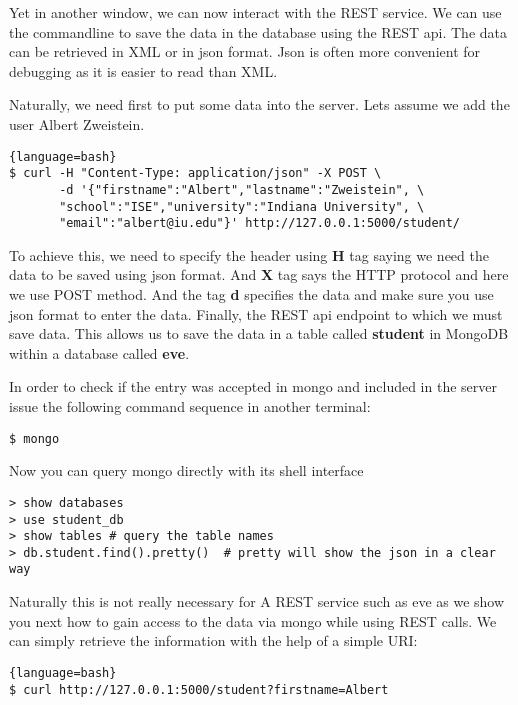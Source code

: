 Yet in another window, we can now interact with the REST service.
We can use the commandline to save the data in the database using the
REST api. The data can be retrieved in XML or in json format. Json is
often more convenient for debugging as it is easier to read than XML.

Naturally, we need first to put some data into the server. Lets assume
we add the user Albert Zweistein.

\begin{lstlisting}{language=bash}
$ curl -H "Content-Type: application/json" -X POST \
       -d '{"firstname":"Albert","lastname":"Zweistein", \
       "school":"ISE","university":"Indiana University", \
       "email":"albert@iu.edu"}' http://127.0.0.1:5000/student/
\end{lstlisting}

To achieve this, we need to specify the header using \textbf{H} tag
saying we need the data to be saved using json format. And \textbf{X}
tag says the HTTP protocol and here we use POST method. And the tag
\textbf{d} specifies the data and make sure you use json format to
enter the data. Finally, the REST api endpoint to which we must save
data. This allows us to save the data in a table called
\textbf{student} in MongoDB within a database called \textbf{eve}.

In order to check if the entry was accepted in mongo and included in the
server issue the following command sequence in another terminal:

\begin{lstlisting}
$ mongo
\end{lstlisting}

Now you can query mongo directly with its shell interface

\begin{lstlisting}
> show databases
> use student_db  
> show tables # query the table names
> db.student.find().pretty()  # pretty will show the json in a clear way
\end{lstlisting}

Naturally this is not really necessary for A REST service such as eve
as we show you next how to gain access to the data via mongo while
using REST calls. We can simply retrieve
the information with the help of a simple URI:


\begin{lstlisting}{language=bash}
$ curl http://127.0.0.1:5000/student?firstname=Albert
\end{lstlisting}

